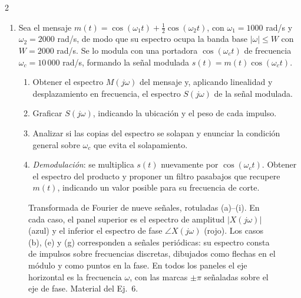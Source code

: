 \documentclass[10pt,a4paper]{article}
\begin{document}
\begin{multicols}{2}
\begin{enumerate}
			\textbf{Modulación de amplitud y multiplexado en frecuencia}
			\item Sea el mensaje $m(t) = \cos(\omega_1 t) + \tfrac{1}{2}\cos(\omega_2 t)$, con $\omega_1 = 1000$ rad/s y $\omega_2 = 2000$ rad/s, de modo que su espectro ocupa la banda base $|\omega| \leq W$ con $W = 2000$ rad/s. Se lo modula con una portadora $\cos(\omega_c t)$ de frecuencia $\omega_c = 10\,000$ rad/s, formando la señal modulada $s(t) = m(t)\cos(\omega_c t)$.
			\begin{enumerate}
				\item Obtener el espectro $M(j\omega)$ del mensaje y, aplicando linealidad y desplazamiento en frecuencia, el espectro $S(j\omega)$ de la señal modulada.
				\item Graficar $S(j\omega)$, indicando la ubicación y el peso de cada impulso.
				\item Analizar si las copias del espectro se solapan y enunciar la condición general sobre $\omega_c$ que evita el solapamiento.
				\item \emph{Demodulación}: se multiplica $s(t)$ nuevamente por $\cos(\omega_c t)$. Obtener el espectro del producto y proponer un filtro pasabajos que recupere $m(t)$, indicando un valor posible para su frecuencia de corte.
			\end{enumerate}

		\end{enumerate}

	\end{multicols}

	\begin{figure}[tp]
		\centering
		
		\caption{Transformada de Fourier de nueve señales, rotuladas (a)--(i). En cada caso, el panel superior es el espectro de amplitud $|X(j\omega)|$ (azul) y el inferior el espectro de fase $\angle X(j\omega)$ (rojo). Los casos (b), (e) y (g) corresponden a señales periódicas: su espectro consta de impulsos sobre frecuencias discretas, dibujados como flechas en el módulo y como puntos en la fase. En todos los paneles el eje horizontal es la frecuencia $\omega$, con las marcas $\pm\pi$ señaladas sobre el eje de fase. Material del Ej.~6.}
		\label{fig:espectros_simetria}
	\end{figure}
\end{document}

